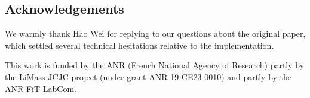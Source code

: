 
\subsection*{Acknowledgements}

We warmly thank Hao Wei for replying to our questions about the original paper, which settled several technical hesitations relative to the implementation.

This work is funded by the ANR (French National Agency of Research) partly by the \href{http://bit.ly/LiMass}{LiMass JCJC project} (under grant ANR-19-CE23-0010) and partly by the \href{http://fit.complexnetworks.fr}{ANR FiT LabCom}.

